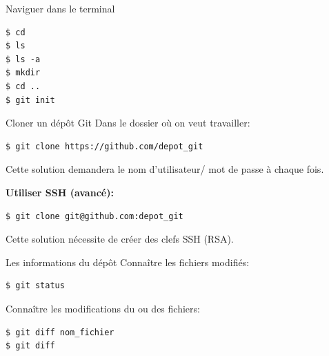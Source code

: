 \documentclass[presentation]{beamer}
\begin{document}
\begin{frame}[fragile]{Naviguer dans le terminal}
\begin{lstlisting}
$ cd
$ ls
$ ls -a
$ mkdir
$ cd ..
$ git init
\end{lstlisting}
\end{frame}

\begin{frame}[fragile]{Cloner un dépôt Git}
Dans le dossier où on veut travailler:
\begin{lstlisting}
$ git clone https://github.com/depot_git
\end{lstlisting}
Cette solution demandera le nom d'utilisateur/ mot de passe à chaque fois.
\pause

\textbf{Utiliser SSH (avancé):}
\begin{lstlisting}
$ git clone git@github.com:depot_git
\end{lstlisting}
Cette solution nécessite de créer des clefs SSH (RSA).
\begin{figure}%
\end{figure}
\end{frame}

\begin{frame}[fragile]{Les informations du dépôt}
Connaître les fichiers modifiés:
\begin{lstlisting}
$ git status
\end{lstlisting}
Connaître les modifications du ou des fichiers:
\begin{lstlisting}
$ git diff nom_fichier
$ git diff
\end{lstlisting}

\end{frame}
\end{document}
